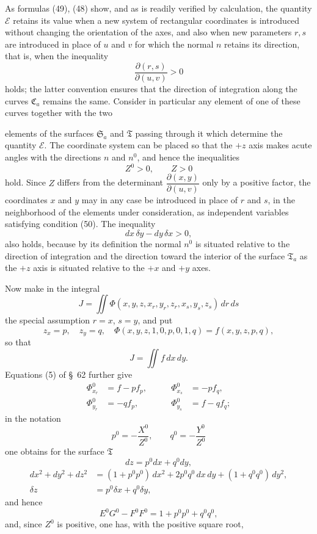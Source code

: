 \documentclass[11pt,a4paper,leqno]{article}
\begin{document}
As formulas (49), (48) show, and as is readily verified by calculation, the
quantity $\mathcal{E}$ retains its value when a new system of rectangular
coordinates is introduced without changing the orientation of the axes, and
also when new parameters $r,s$ are introduced in place of $u$ and $v$ for
which the normal $n$ retains its direction, that is, when the inequality
\begin{equation}\tag{50}
\frac{\partial(r,s)}{\partial(u,v)}>0
\end{equation}
holds; the latter convention ensures that the direction of integration along
the curves $\mathfrak{C}_a$ remains the same. Consider in particular any
element of one of these curves together with the two

elements of the surfaces $\mathfrak{S}_a$ and $\mathfrak{T}$ passing through
it which determine the quantity $\mathcal{E}$. The coordinate system can be
placed so that the $+z$ axis makes acute angles with the directions $n$ and
$n^0$, and hence the inequalities
\[
Z^0>0,\qquad Z>0
\]
hold. Since $Z$ differs from the determinant
$\dfrac{\partial(x,y)}{\partial(u,v)}$ only by a positive factor, the
coordinates $x$ and $y$ may in any case be introduced in place of $r$ and
$s$, in the neighborhood of the elements under consideration, as independent
variables satisfying condition (50). The inequality
\begin{equation}\tag{51}
dx\,\delta y-dy\,\delta x>0,
\end{equation}
also holds, because by its definition the normal $n^0$ is situated relative
to the direction of integration and the direction toward the interior of the
surface $\mathfrak{T}_a$ as the $+z$ axis is situated relative to the $+x$
and $+y$ axes.

Now make in the integral
\[
J=\iint\Phi(x,y,z,x_r,y_r,z_r,x_s,y_s,z_s)\,dr\,ds
\]
the special assumption $r=x$, $s=y$, and put
\[
z_x=p,\quad z_y=q,\quad
\Phi(x,y,z,1,0,p,0,1,q)=f(x,y,z,p,q),
\]
so that
\[
J=\iint f\,dx\,dy.
\]
Equations (5) of \S~62 further give
\[
\begin{aligned}
\Phi^0_{x_r}&=f-pf_p,&\qquad \Phi^0_{x_s}&=-pf_q,\\
\Phi^0_{y_r}&=-qf_p,&\qquad \Phi^0_{y_s}&=f-qf_q;
\end{aligned}
\]
in the notation
\[
p^0=-\frac{X^0}{Z^0},\qquad q^0=-\frac{Y^0}{Z^0}
\]
one obtains for the surface $\mathfrak{T}$
\[
dz=p^0dx+q^0dy,
\]
\[
\begin{aligned}
dx^2+dy^2+dz^2
&=(1+p^0p^0)\,dx^2+2p^0q^0\,dx\,dy+(1+q^0q^0)\,dy^2,\\
\delta z&=p^0\delta x+q^0\delta y,
\end{aligned}
\]
and hence
\[
E^0G^0-F^0F^0=1+p^0p^0+q^0q^0,
\]
and, since $Z^0$ is positive, one has, with the positive square root,
\end{document}
